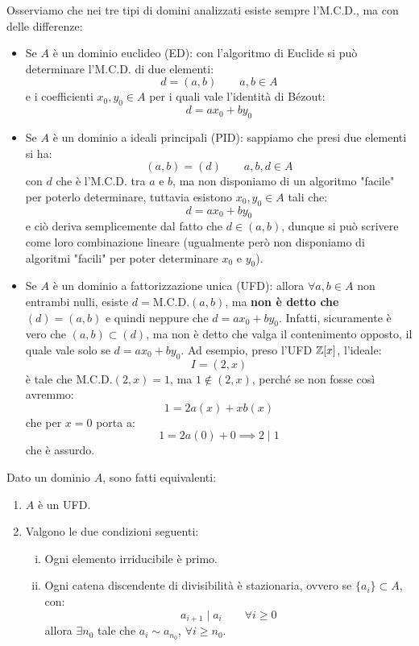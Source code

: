\documentclass[11pt]{scrartcl}
\begin{document}
\begin{remark}
    Osserviamo che nei tre tipi di domini analizzati esiste sempre l'M.C.D., ma con delle differenze:
    \begin{itemize}
        \item Se $A$ è un dominio euclideo (ED): con l'algoritmo di Euclide si può determinare l'M.C.D. di due elementi:
        \[ d = (a,b) \qquad a,b \in A
            \]
        e i coefficienti $x_0,y_0 \in A$ per i quali vale l'identità di Bézout:
        \[ d = ax_0 + by_0
            \]
        \item Se $A$ è un dominio a ideali principali (PID): sappiamo che presi due elementi si ha:
        \[ (a,b) = (d) \qquad a,b,d \in A
            \]
        con $d$ che è l'M.C.D. tra $a$ e $b$, ma non disponiamo di un algoritmo "facile" per poterlo determinare, tuttavia esistono $x_0, y_0 \in A$ tali che:
        \[ d = ax_0 + by_0
            \]
        e ciò deriva semplicemente dal fatto che $d \in (a,b)$, dunque si può scrivere come loro combinazione lineare (ugualmente però non disponiamo di algoritmi "facili" per poter determinare $x_0$ e $y_0$).
        \item Se $A$ è un dominio a fattorizzazione unica (UFD): allora $\forall a,b \in A$ non entrambi nulli, esiste $d = \text{M.C.D.}(a,b)$, ma \textbf{non è detto che} $(d) = (a,b)$ e quindi neppure che $d = ax_0 + by_0$.
        Infatti, sicuramente è vero che $(a,b) \subset (d)$, ma non è detto che valga il contenimento opposto, il quale vale solo se $d = ax_0 + by_0$. Ad esempio, preso l'UFD $\mathbb Z[x]$, l'ideale:
        \[ I = (2,x)
            \]
        è tale che $\text{M.C.D.}(2,x) = 1$, ma $1 \not \in (2,x)$, perché se non fosse così avremmo:
        \[ 1 = 2a(x) + xb(x)
            \]
        che per $x = 0$ porta a:
        \[ 1 = 2a(0) + 0 \implies 2 \mid 1
            \]
        che è assurdo.
    \end{itemize}
\end{remark}

\begin{theorem}
    \label{2.101}
    Dato un dominio $A$, sono fatti equivalenti:
    \begin{enumerate}[(1)]
        \item $A$ è un UFD.
        \item Valgono le due condizioni seguenti:
        \begin{enumerate}[(i)]
            \item Ogni elemento irriducibile è primo.
            \item Ogni catena discendente di divisibilità è stazionaria, ovvero se $\{a_i\} \subset A$, con:
            \[ a_{i+1} \mid a_i \qquad \forall i \geq 0
                \]
            allora $\exists n_0$ tale che $a_i \sim a_{n_0}$, $\forall i \geq n_0$.
        \end{enumerate}
    \end{enumerate}
\end{theorem}
\end{document}
